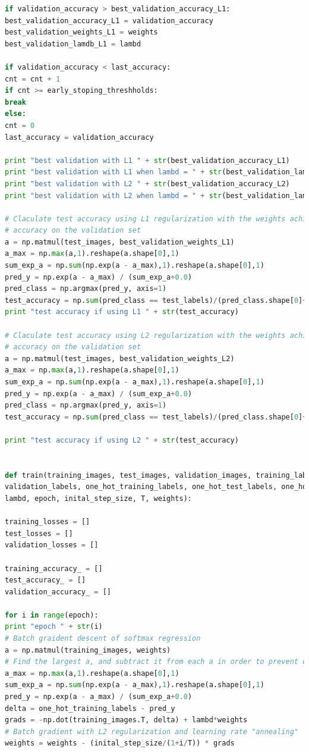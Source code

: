 \documentclass{article} %
\begin{document}
{\begin{lstlisting}[language=Python]
if validation_accuracy > best_validation_accuracy_L1:
best_validation_accuracy_L1 = validation_accuracy
best_validation_weights_L1 = weights
best_validation_lamdb_L1 = lambd

if validation_accuracy < last_accuracy:
cnt = cnt + 1
if cnt >= early_stoping_threshholds:
break
else:
cnt = 0
last_accuracy = validation_accuracy

print "best validation with L1 " + str(best_validation_accuracy_L1)
print "best validation with L1 when lambd = " + str(best_validation_lamdb_L1)
print "best validation with L2 " + str(best_validation_accuracy_L2)
print "best validation with L2 when lambd = " + str(best_validation_lamdb_L2)

# Claculate test accuracy using L1 regularization with the weights achieve highest 
# accuracy on the validation set
a = np.matmul(test_images, best_validation_weights_L1) 
a_max = np.max(a,1).reshape(a.shape[0],1)
sum_exp_a = np.sum(np.exp(a - a_max),1).reshape(a.shape[0],1)
pred_y = np.exp(a - a_max) / (sum_exp_a+0.0) 
pred_class = np.argmax(pred_y, axis=1)
test_accuracy = np.sum(pred_class == test_labels)/(pred_class.shape[0]+0.0)
print "test accuracy if using L1 " + str(test_accuracy) 

# Claculate test accuracy using L2 regularization with the weights achieve highest 
# accuracy on the validation set
a = np.matmul(test_images, best_validation_weights_L2) 
a_max = np.max(a,1).reshape(a.shape[0],1)
sum_exp_a = np.sum(np.exp(a - a_max),1).reshape(a.shape[0],1) 
pred_y = np.exp(a - a_max) / (sum_exp_a+0.0) 
pred_class = np.argmax(pred_y, axis=1)
test_accuracy = np.sum(pred_class == test_labels)/(pred_class.shape[0]+0.0)

print "test accuracy if using L2 " + str(test_accuracy) 


def train(training_images, test_images, validation_images, training_labels, test_labels, \
validation_labels, one_hot_training_labels, one_hot_test_labels, one_hot_validation_labels, \
lambd, epoch, inital_step_size, T, weights):

training_losses = []
test_losses = []
validation_losses = []

training_accuracy_ = []
test_accuracy_ = []
validation_accuracy_ = []

for i in range(epoch):
print "epoch " + str(i)
# Batch graident descent of softmax regression
a = np.matmul(training_images, weights) 
# Find the largest a, and subtract it from each a in order to prevent overflow
a_max = np.max(a,1).reshape(a.shape[0],1)
sum_exp_a = np.sum(np.exp(a - a_max),1).reshape(a.shape[0],1) 
pred_y = np.exp(a - a_max) / (sum_exp_a+0.0) 
delta = one_hot_training_labels - pred_y 
grads = -np.dot(training_images.T, delta) + lambd*weights
# Batch gradient with L2 regularization and learning rate "annealing"
weights = weights - (inital_step_size/(1+i/T)) * grads


\end{lstlisting}}
\end{document}
